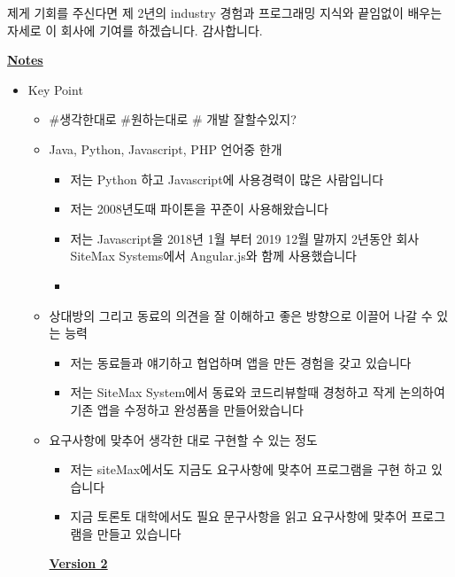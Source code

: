 \documentclass[12pt]{article}
\begin{document}
\bigskip

제게 기회를 주신다면 제 2년의 industry 경험과 프로그래밍 지식와 끝임없이 배우는 자세로 이 회사에 기여를 하겠습니다. 감사합니다.

\bigskip

\underline{\textbf{Notes}}

\begin{itemize}
    \item Key Point
    \begin{itemize}
        \item \#생각한대로 \#원하는대로 \# 개발 잘할수있지?
        \item Java, Python, Javascript, PHP 언어중 한개
        \begin{itemize}
            \item 저는 Python 하고 Javascript에 사용경력이 많은 사람입니다
            \item 저는 2008년도때 파이톤을 꾸준이 사용해왔습니다
            \item 저는 Javascript을 2018년 1월 부터 2019 12월 말까지 2년동안 회사 SiteMax Systems에서 Angular.js와 함께 사용했습니다
            \item
        \end{itemize}
        \item 상대방의 그리고 동료의 의견을 잘 이해하고 좋은 방향으로 이끌어 나갈 수 있는 능력
        \begin{itemize}
            \item 저는 동료들과 얘기하고 협업하며 앱을 만든 경험을 갖고 있습니다
            \item 저는 SiteMax System에서 동료와 코드리뷰할때 경청하고 작게 논의하여 기존 앱을 수정하고 완성품을 만들어왔습니다
        \end{itemize}
        \item 요구사항에 맞추어 생각한 대로 구현할 수 있는 정도
        \begin{itemize}
            \item 저는 siteMax에서도 지금도 요구사항에 맞추어 프로그램을 구현 하고 있습니다
            \item 지금 토론토 대학에서도 필요 문구사항을 읽고 요구사항에 맞추어 프로그램을 만들고 있습니다
        \end{itemize}

        \bigskip

        \underline{\textbf{Version 2}}

        \bigskip


\end{itemize}
\end{itemize}
\end{document}
